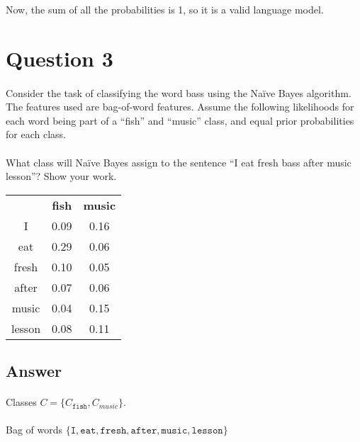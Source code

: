 \documentclass{article}
\begin{document}
Now, the sum of all the probabilities is 1, so it is a valid language model.

\clearpage

\section*{Question 3}

\paragraph{} Consider the task of classifying the word bass using the Naïve Bayes algorithm. The features used are bag-of-word features. Assume the following likelihoods for each word being part of a “fish” and “music” class, and equal prior probabilities for each class.

\paragraph{} What class will Naïve Bayes assign to the sentence “I eat fresh bass after music lesson”? Show your work.\\

\begin{tabular}{c|c|c}
    \hline
     & \textbf{fish} & \textbf{music} \\
    I & 0.09 & 0.16 \\
    eat & 0.29 & 0.06 \\
    fresh & 0.10 & 0.05 \\
    after & 0.07 & 0.06 \\
    music & 0.04 & 0.15 \\
    lesson & 0.08 & 0.11 \\
\end{tabular}

\subsection*{Answer}

\paragraph{} Classes $C = \{ C_{\texttt{fish}}, C_{music} \}$.

\paragraph{} Bag of words $\{\texttt{I}, \texttt{eat}, \texttt{fresh}, \texttt{after}, \texttt{music}, \texttt{lesson}\}$
\end{document}
